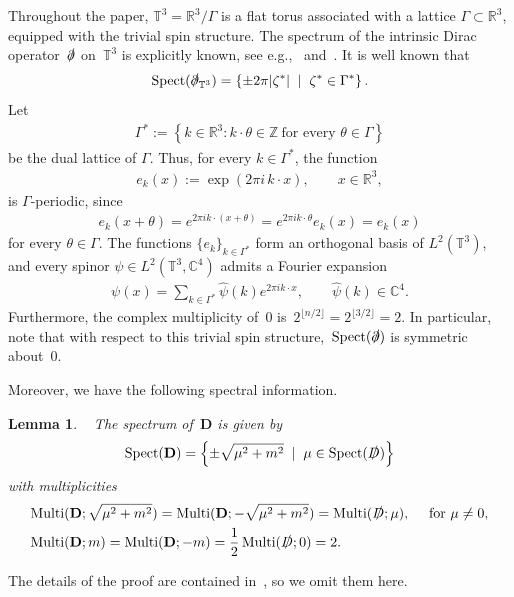 \documentclass[11pt,final]{amsart}
\newcommand{\braces}[1]{\left\{#1\right\}} %
\newcommand{\T}{\mathbb{T}}
\newcommand{\D}{\slashed{D}}
\newcommand{\pd}{\slashed{\partial}}
\newcommand{\pD}{\mathbf{D}}
\DeclareMathOperator{\Mtp}{Multi} %
\DeclareMathOperator{\Spect}{Spect}
\newtheorem{lemma}[thm]{Lemma}
\begin{document}
Throughout the paper, $\T^3=\mathbb R^3/\Gamma$ is a flat torus
associated with a lattice $\Gamma\subset\mathbb R^3$, equipped with the trivial spin structure. The spectrum of the intrinsic Dirac operator~$\pd$ on~$\T^3$ is explicitly known, see e.g.,~\cite{Friedrich1984zur} and~\cite[Chapter 2.1]{Ginoux2009Dirac}. It is well known that
\begin{align}
    \Spect(\pd_{\T^3})=\braces{\pm2\pi |\zeta^*| \; \mid\;  \zeta^*\in \Gamma^*}.
\end{align}
Let
\begin{align}
\Gamma^*
:=
\left\{
k\in\mathbb R^3:
k\cdot\theta\in\mathbb Z
\ \text{for every }\theta\in\Gamma
\right\}
\end{align}
be the dual lattice of $\Gamma$. Thus, for every $k\in\Gamma^*$, the function
\begin{align}
e_k(x):=
\exp(2\pi i\, k\cdot x),
\qquad x\in\mathbb R^3,
\end{align}
is $\Gamma$-periodic, since
\begin{align}
e_k(x+\theta)
=
e^{2\pi i k\cdot(x+\theta)}
=
e^{2\pi i k\cdot\theta}e_k(x)
=
e_k(x)
\end{align}
for every $\theta\in\Gamma$. The functions $\{e_k\}_{k\in\Gamma^*}$ form an
orthogonal basis of $L^2(\T^3)$, and every spinor
$\psi\in L^2(\T^3,\mathbb C^4)$ admits a Fourier expansion
\begin{align}
\psi(x)
=
\sum_{k\in\Gamma^*}\widehat\psi(k)e^{2\pi i k\cdot x},
\qquad
\widehat\psi(k)\in\mathbb C^4.
\end{align}
Furthermore, the complex multiplicity of~$0$ is~$2^{{\lfloor n/2\rfloor}}=2^{{\lfloor 3/2\rfloor}}=2$. In particular, note that with respect to this trivial spin structure,~$\Spect(\pd)$ is symmetric about~$0$.


Moreover, we have the following spectral information.

\begin{lemma}\label{lemma:spectrum D}~\cite[Lemma 2.2]{WZ2026Stationary}
    The spectrum of~$\pD$ is given by
    \begin{align}
        \Spect(\pD)
        =\braces{\pm\sqrt{\mu^2+ m^2} \; \mid \; \mu\in\Spect(\D)}
    \end{align}
    with multiplicities
    \begin{align}
        \Mtp&(\pD; \sqrt{\mu^2+m^2})= \Mtp(\pD; -\sqrt{\mu^2+m^2}) = \Mtp(\D; \mu),\quad \mbox{ for } \mu\neq 0, \\
        \Mtp&(\pD;m)=\Mtp(\pD;-m)=\frac{1}{2}\Mtp(\D;0)=2.
    \end{align}
\end{lemma}
The details of the proof are contained in~\cite{WZ2026Stationary}, so we omit them here.
\end{document}
